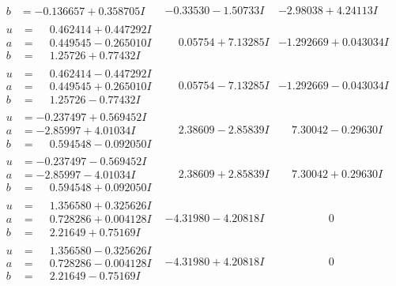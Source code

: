 \documentclass[1p]{elsarticle_modified}
\theoremstyle{definition}
\begin{document}
$$\begin{array}{c|c|c}
\begin{aligned}
b &= -0.136657 + 0.358705 I\end{aligned}
 & -0.33530 - 1.50733 I & -2.98038 + 4.24113 I \\ \hline\begin{aligned}
u &= \phantom{-}0.462414 + 0.447292 I \\
a &= \phantom{-}0.449545 - 0.265010 I \\
b &= \phantom{-}1.25726 + 0.77432 I\end{aligned}
 & \phantom{-}0.05754 + 7.13285 I & -1.292669 + 0.043034 I \\ \hline\begin{aligned}
u &= \phantom{-}0.462414 - 0.447292 I \\
a &= \phantom{-}0.449545 + 0.265010 I \\
b &= \phantom{-}1.25726 - 0.77432 I\end{aligned}
 & \phantom{-}0.05754 - 7.13285 I & -1.292669 - 0.043034 I \\ \hline\begin{aligned}
u &= -0.237497 + 0.569452 I \\
a &= -2.85997 + 4.01034 I \\
b &= \phantom{-}0.594548 - 0.092050 I\end{aligned}
 & \phantom{-}2.38609 - 2.85839 I & \phantom{-}7.30042 - 0.29630 I \\ \hline\begin{aligned}
u &= -0.237497 - 0.569452 I \\
a &= -2.85997 - 4.01034 I \\
b &= \phantom{-}0.594548 + 0.092050 I\end{aligned}
 & \phantom{-}2.38609 + 2.85839 I & \phantom{-}7.30042 + 0.29630 I \\ \hline\begin{aligned}
u &= \phantom{-}1.356580 + 0.325626 I \\
a &= \phantom{-}0.728286 + 0.004128 I \\
b &= \phantom{-}2.21649 + 0.75169 I\end{aligned}
 & -4.31980 - 4.20818 I & \phantom{-0.000000 } 0 \\ \hline\begin{aligned}
u &= \phantom{-}1.356580 - 0.325626 I \\
a &= \phantom{-}0.728286 - 0.004128 I \\
b &= \phantom{-}2.21649 - 0.75169 I\end{aligned}
 & -4.31980 + 4.20818 I & \phantom{-0.000000 } 0 \\ \hline\begin{aligned}

\end{aligned}
\end{array}$$
\end{document}
